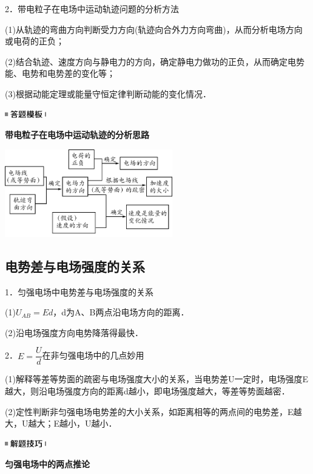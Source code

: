 2．带电粒子在电场中运动轨迹问题的分析方法

(1)从轨迹的弯曲方向判断受力方向(轨迹向合外力方向弯曲)，从而分析电场方向或电荷的正负；

(2)结合轨迹、速度方向与静电力的方向，确定静电力做功的正负，从而确定电势能、电势和电势差的变化等；

(3)根据动能定理或能量守恒定律判断动能的变化情况．

\begin{center}\includegraphics[width=0.70833in,height=0.125in]{media/image25.png}

\textbf{带电粒子在电场中运动轨迹的分析思路}
\end{center}


\begin{center}\includegraphics[width=2.875in,height=1.5in]{media/image280.png}\end{center}

\newpage
\subsection{电势差与电场强度的关系}

1．匀强电场中电势差与电场强度的关系

(1)$U_{A B}=E d$，d为A、B两点沿电场方向的距离．

(2)沿电场强度方向电势降落得最快．

2．$E=\dfrac{U}{d}$在非匀强电场中的几点妙用

(1)解释等差等势面的疏密与电场强度大小的关系，当电势差U一定时，电场强度E越大，则沿电场强度方向的距离d越小，即电场强度越大，等差等势面越密．

(2)定性判断非匀强电场电势差的大小关系，如距离相等的两点间的电势差，E越大，U越大；E越小，U越小．

\begin{center}\includegraphics[width=0.70833in,height=0.125in]{media/image37.png}

\textbf{匀强电场中的两点推论}
\end{center}



